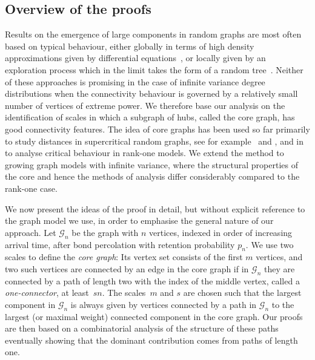 \documentclass[12pt,a4paper]{article}
\numberwithin{equation}{section}
\begin{document}
\subsection{Overview of the proofs}

Results on the emergence of large components in random graphs are most often based 
on typical behaviour, either globally in terms of high density approximations given by differential equations~\cite{MR, BBS, sen}, or locally given by an exploration process which in the limit takes the form of a random tree~\cite{bjr, dm, nick, JMM}.  Neither of these approaches is promising in the case of infinite variance degree distributions when the connectivity behaviour is governed by a relatively small number of vertices of extreme power. We therefore base our analysis on the identification of scales in which a subgraph of hubs, called the core graph, has good connectivity features. The idea of core graphs has been used so far primarily to study distances in supercritical random graphs, see for example~\cite{mth} and \cite[Section 8.7.1]{rg2}, and in~\cite{BDH} to analyse critical behaviour in rank-one models. We  extend the method to growing graph models with infinite variance, where the structural properties of the core and hence the methods of analysis differ considerably compared to the rank-one case. \smallskip 


We now present the ideas of the proof in detail, but without explicit reference to the graph model we use, in order to emphasise the general nature of our approach. Let $\mathscr G_n$ be the graph with $n$ vertices, indexed in order of increasing arrival time, after bond percolation with retention probability $p_n$. We use two scales to define the \emph{core graph}: Its vertex set consists of the first $m$ vertices, and two such vertices are connected by an edge in the core graph if in $\mathscr G_n$ they are  connected by a path of 
length two  with the index of the middle vertex,  called a \emph{one-connector},
at least~$sn$. The scales~$m$ and $s$ are chosen
such that the largest component in $\mathscr G_n$ is always given by vertices connected by a path in $\mathscr G_n$ to the largest (or maximal weight) connected component in the core graph. Our proofs are then based on a combinatorial analysis of  the structure of these paths eventually showing that the dominant contribution comes from paths of length one.
\end{document}
